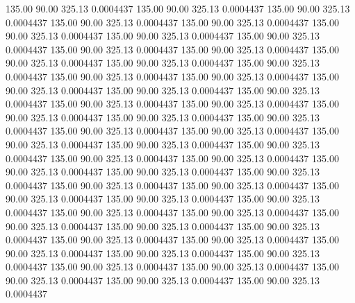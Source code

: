  135.00   90.00  325.13   0.0004437
 135.00   90.00  325.13   0.0004437
 135.00   90.00  325.13   0.0004437
 135.00   90.00  325.13   0.0004437
 135.00   90.00  325.13   0.0004437
 135.00   90.00  325.13   0.0004437
 135.00   90.00  325.13   0.0004437
 135.00   90.00  325.13   0.0004437
 135.00   90.00  325.13   0.0004437
 135.00   90.00  325.13   0.0004437
 135.00   90.00  325.13   0.0004437
 135.00   90.00  325.13   0.0004437
 135.00   90.00  325.13   0.0004437
 135.00   90.00  325.13   0.0004437
 135.00   90.00  325.13   0.0004437
 135.00   90.00  325.13   0.0004437
 135.00   90.00  325.13   0.0004437
 135.00   90.00  325.13   0.0004437
 135.00   90.00  325.13   0.0004437
 135.00   90.00  325.13   0.0004437
 135.00   90.00  325.13   0.0004437
 135.00   90.00  325.13   0.0004437
 135.00   90.00  325.13   0.0004437
 135.00   90.00  325.13   0.0004437
 135.00   90.00  325.13   0.0004437
 135.00   90.00  325.13   0.0004437
 135.00   90.00  325.13   0.0004437
 135.00   90.00  325.13   0.0004437
 135.00   90.00  325.13   0.0004437
 135.00   90.00  325.13   0.0004437
 135.00   90.00  325.13   0.0004437
 135.00   90.00  325.13   0.0004437
 135.00   90.00  325.13   0.0004437
 135.00   90.00  325.13   0.0004437
 135.00   90.00  325.13   0.0004437
 135.00   90.00  325.13   0.0004437
 135.00   90.00  325.13   0.0004437
 135.00   90.00  325.13   0.0004437
 135.00   90.00  325.13   0.0004437
 135.00   90.00  325.13   0.0004437
 135.00   90.00  325.13   0.0004437
 135.00   90.00  325.13   0.0004437
 135.00   90.00  325.13   0.0004437
 135.00   90.00  325.13   0.0004437
 135.00   90.00  325.13   0.0004437
 135.00   90.00  325.13   0.0004437
 135.00   90.00  325.13   0.0004437
 135.00   90.00  325.13   0.0004437
 135.00   90.00  325.13   0.0004437
 135.00   90.00  325.13   0.0004437
 135.00   90.00  325.13   0.0004437
 135.00   90.00  325.13   0.0004437
 135.00   90.00  325.13   0.0004437
